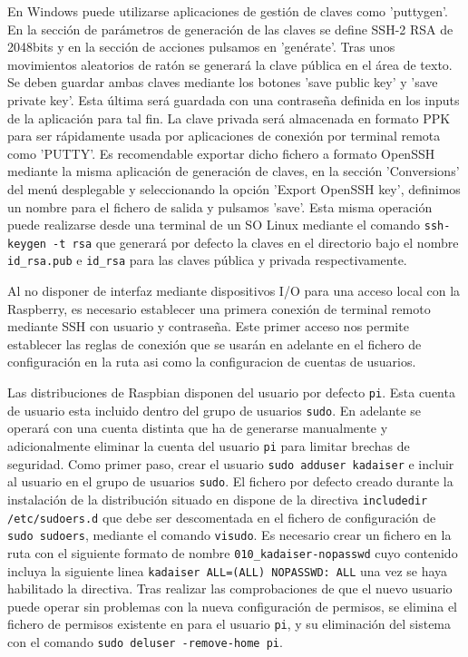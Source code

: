 En Windows puede utilizarse aplicaciones de gestión de claves como 'puttygen'. En la sección de parámetros de generación de las claves se define SSH-2 RSA de 2048bits y en la sección de acciones pulsamos en 'genérate'. Tras unos movimientos aleatorios de ratón se generará la clave pública en el área de texto. Se deben guardar ambas claves mediante los botones 'save public key' y 'save private key'. Esta última será guardada con una contraseña definida en los inputs de la aplicación para tal fin. La clave privada será almacenada en formato PPK para ser rápidamente usada por aplicaciones de conexión por terminal remota como 'PUTTY'. Es recomendable exportar dicho fichero a formato OpenSSH mediante la misma aplicación de generación de claves, en la sección 'Conversions' del menú desplegable y seleccionando la opción 'Export OpenSSH key', definimos un nombre para el fichero de salida y pulsamos 'save'. Esta misma operación puede realizarse desde una terminal de un SO Linux mediante el comando \verb|ssh-keygen -t rsa| que generará por defecto la claves en el directorio  bajo el nombre \verb|id_rsa.pub| e \verb|id_rsa| para las claves pública y privada respectivamente.

Al no disponer de interfaz mediante dispositivos I/O para una acceso local con la Raspberry, es necesario establecer una primera conexión de terminal remoto mediante SSH con usuario y contraseña. Este primer acceso nos permite establecer las reglas de conexión que se usarán en adelante en el fichero de configuración en la ruta  asi como la configuracion de cuentas de usuarios.

Las distribuciones de Raspbian disponen del usuario por defecto \verb|pi|. Esta cuenta de usuario esta incluido dentro del grupo de usuarios \verb|sudo|. En adelante se operará con una cuenta distinta que ha de generarse manualmente y adicionalmente eliminar la cuenta del usuario \verb|pi| para limitar brechas de seguridad. Como primer paso, crear el usuario \verb|sudo adduser kadaiser| e incluir al usuario en el grupo de usuarios \verb|sudo|. El fichero por defecto creado durante la instalación de la distribución situado en  dispone de la directiva \verb|includedir /etc/sudoers.d| que debe ser descomentada en el fichero de configuración de \verb|sudo sudoers|, mediante el comando \verb|visudo|. Es necesario crear un fichero en la ruta  con el siguiente formato de nombre \verb|010_kadaiser-nopasswd| cuyo contenido incluya la siguiente linea \verb|kadaiser ALL=(ALL) NOPASSWD: ALL| una vez se haya habilitado la directiva. Tras realizar las comprobaciones de que el nuevo usuario puede operar sin problemas con la nueva configuración de permisos, se elimina el fichero de permisos existente en  para el usuario \verb|pi|, y su eliminación del sistema con el comando \verb|sudo deluser -remove-home pi|.

